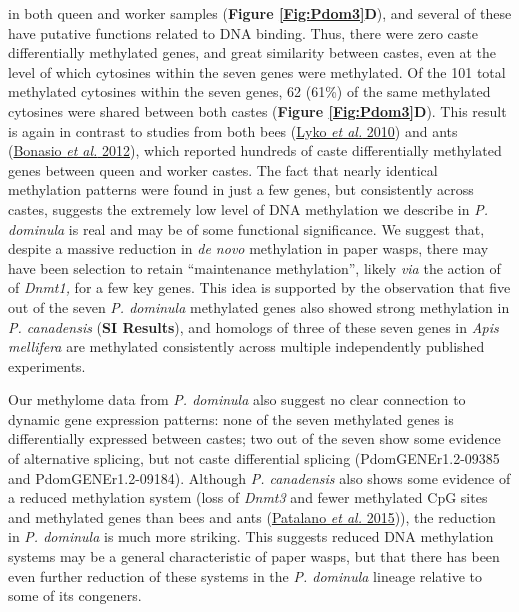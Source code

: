 in both queen and worker samples (\textbf{Figure \ref{Fig:Pdom3}D}), and several of
these have putative functions related to DNA binding. Thus, there were
zero caste differentially methylated genes, and great similarity between
castes, even at the level of which cytosines within the seven genes were
methylated. Of the 101 total methylated cytosines within the seven
genes, 62 (61\%) of the same methylated cytosines were shared between
both castes (\textbf{Figure \ref{Fig:Pdom3}D}). This result is again in contrast to
studies from both bees (\protect\hyperlink{ux5fENREFux5f33}{Lyko
\textit{et al.} 2010}) and ants
(\protect\hyperlink{ux5fENREFux5f4}{Bonasio \textit{et al.} 2012}), which
reported hundreds of caste differentially methylated genes between queen
and worker castes. The fact that nearly identical methylation patterns
were found in just a few genes, but consistently across castes, suggests
the extremely low level of DNA methylation we describe in \textit{P.
dominula} is real and may be of some functional significance. We suggest
that, despite a massive reduction in \textit{de novo} methylation in paper
wasps, there may have been selection to retain ``maintenance
methylation'', likely \textit{via} the action of of \textit{Dnmt1,} for a
few key genes. This idea is supported by the observation that five out
of the seven \textit{P. dominula} methylated genes also showed strong
methylation in \textit{P. canadensis} (\textbf{SI Results}), and homologs
of three of these seven genes in \textit{Apis mellifera} are methylated
consistently across multiple independently published experiments.

Our methylome data from \textit{P. dominula} also suggest no clear
connection to dynamic gene expression patterns: none of the seven
methylated genes is differentially expressed between castes; two out of
the seven show some evidence of alternative splicing, but not caste
differential splicing (PdomGENEr1.2-09385 and PdomGENEr1.2-09184).
Although \textit{P. canadensis} also shows some evidence of a reduced
methylation system (loss of \textit{Dnmt3} and fewer methylated CpG sites
and methylated genes than bees and ants
(\protect\hyperlink{ux5fENREFux5f43}{Patalano \textit{et al.} 2015})), the
reduction in \textit{P. dominula} is much more striking. This suggests
reduced DNA methylation systems may be a general characteristic of paper
wasps, but that there has been even further reduction of these systems
in the \textit{P. dominula} lineage relative to some of its congeners.

